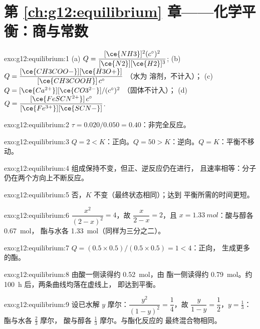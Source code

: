 \section*{第 \ref{ch:g12:equilibrium} 章——化学平衡：商与常数}

\begin{solution}{exo:g12:equilibrium:1}
(a) $Q = \dfrac{[\ce{NH3}]^2 (c^\circ)^2}{[\ce{N2}][\ce{H2}]^3}$;
(b) $Q = \dfrac{[\ce{CH3COO-}][\ce{H3O+}]}{[\ce{CH3COOH}]\,c^\circ}$ （水为
溶剂，不计入）；
(c) $Q = [\ce{Ca^{2+}}][\ce{CO3^{2-}}]/(c^\circ)^2$ （固体不计入）；
(d) $Q = \dfrac{[\ce{FeSCN^{2+}}]\,c^\circ}{[\ce{Fe^{3+}}][\ce{SCN-}]}$.
\end{solution}

\begin{solution}{exo:g12:equilibrium:2}
$\tau = 0.020/0.050 = 0.40$：非完全反应。
\end{solution}

\begin{solution}{exo:g12:equilibrium:3}
$Q = 2 < K$：正向。$Q = 50 > K$：逆向。$Q = K$：平衡不移动。
\end{solution}

\begin{solution}{exo:g12:equilibrium:4}
组成保持不变，但正、逆反应仍在进行，
且速率相等：分子仍在两个方向上不断反应。
\end{solution}

\begin{solution}{exo:g12:equilibrium:5}
否，$K$ 不变（最终状态相同）；达到
平衡所需的时间更短。
\end{solution}

\begin{solution}{exo:g12:equilibrium:6}
$\dfrac{x^2}{(2-x)^2} = 4$，故 $\dfrac{x}{2-x} = 2$，且
$x = \qty{1.33}{mol}$：酸与醇各 \qty{0.67}{mol}，
酯与水各 \qty{1.33}{mol}（同样为三分之二）。
\end{solution}

\begin{solution}{exo:g12:equilibrium:7}
$Q = (0.5 \times 0.5)/(0.5 \times 0.5) = 1 < 4$：正向，
生成更多的酯。
\end{solution}

\begin{solution}{exo:g12:equilibrium:8}
由酸一侧读得约 \qty{0.52}{mol}，由
酯一侧读得约 \qty{0.79}{mol}。约 \qty{100}{h} 后，两条曲线均落在虚线上，
即达到平衡。
\end{solution}

\begin{solution}{exo:g12:equilibrium:9}
设已水解 $y$ 摩尔：$\dfrac{y^2}{(1-y)^2} = \dfrac{1}{4}$，故
$\dfrac{y}{1-y} = \dfrac{1}{2}$，$y = \frac{1}{3}$：酯与水各 $\frac{2}{3}$ 摩尔，
酸与醇各 $\frac{1}{3}$ 摩尔。与酯化反应的
最终混合物相同。
\end{solution}

